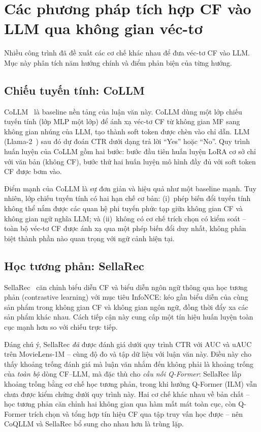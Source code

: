 \section{Các phương pháp tích hợp CF vào LLM qua không gian véc-tơ}
\label{sec:cach-noi-cf-llm}

Nhiều công trình đã đề xuất các cơ chế khác nhau để đưa véc-tơ CF vào LLM. Mục này phân
tích năm hướng chính và điểm phản biện của từng hướng.

\subsection{Chiếu tuyến tính: CoLLM}
\label{ssec:collm}

CoLLM~\cite{collm2023} là baseline nền tảng của luận văn này. CoLLM dùng một lớp chiếu
tuyến tính (lớp MLP một lớp) để ánh xạ véc-tơ CF từ không gian MF sang không gian nhúng
của LLM, tạo thành soft token được chèn vào chỉ dẫn. LLM (Llama-2~\cite{llama2}) sau đó
dự đoán CTR dưới dạng trả lời ``Yes'' hoặc ``No''. Quy trình huấn luyện của
CoLLM gồm hai bước: bước đầu tiên huấn luyện LoRA cơ sở chỉ với văn bản (không CF), bước
thứ hai huấn luyện mô hình đầy đủ với soft token CF được bơm vào.

Điểm mạnh của CoLLM là sự đơn giản và hiệu quả như một baseline mạnh. Tuy nhiên, lớp
chiếu tuyến tính có hai hạn chế cơ bản: (i)~phép biến đổi tuyến tính không thể nắm được
các quan hệ phi tuyến phức tạp giữa không gian CF và không gian ngữ nghĩa LLM; và
(ii)~không có cơ chế trích chọn có kiểm soát -- toàn bộ véc-tơ CF được ánh xạ qua một
phép biến đổi duy nhất, không phân biệt thành phần nào quan trọng với ngữ cảnh hiện tại.

\subsection{Học tương phản: SellaRec}
\label{ssec:sellarec}

SellaRec~\cite{sellarec2024} căn chỉnh biểu diễn CF và biểu diễn ngôn ngữ thông qua học
tương phản (contrastive learning) với mục tiêu InfoNCE: kéo gần biểu diễn của cùng sản
phẩm trong không gian CF và không gian ngôn ngữ, đồng thời đẩy xa các sản phẩm khác nhau.
Cách tiếp cận này cung cấp một tín hiệu huấn luyện toàn cục mạnh hơn so với chiếu trực
tiếp.

Đáng chú ý, SellaRec \textit{đã} được đánh giá dưới quy trình CTR với AUC và uAUC trên
MovieLens-1M -- cùng độ đo và tập dữ liệu với luận văn này. Điều này cho thấy khoảng trống
đánh giá mà luận văn nhắm đến không phải là khoảng trống của \textit{toàn bộ} dòng CF--LLM,
mà đặc thù cho \textit{cầu nối Q-Former}: SellaRec lấp khoảng trống bằng cơ chế học tương
phản, trong khi hướng Q-Former (ILM) vẫn chưa được kiểm chứng dưới quy trình này. Hai cơ
chế khác nhau về bản chất -- học tương phản căn chỉnh hai không gian qua hàm mất mát toàn
cục, còn Q-Former trích chọn và tổng hợp tín hiệu CF qua tập truy vấn học được -- nên
CoQLLM và SellaRec bổ sung cho nhau hơn là trùng lặp.

